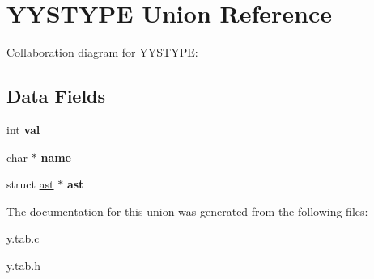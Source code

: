 \hypertarget{union_y_y_s_t_y_p_e}{}\section{Y\+Y\+S\+T\+Y\+PE Union Reference}
\label{union_y_y_s_t_y_p_e}


Collaboration diagram for Y\+Y\+S\+T\+Y\+PE\+:
\subsection*{Data Fields}
\begin{DoxyCompactItemize}
\item 
\mbox{\label{union_y_y_s_t_y_p_e_aa0ccb5ee6d882ee3605ff47745c6467b}} 
int {\bfseries val}
\item 
\mbox{\label{union_y_y_s_t_y_p_e_ad547fb8186b526cb1b588daad4334fbe}} 
char $\ast$ {\bfseries name}
\item 
\mbox{\label{union_y_y_s_t_y_p_e_acfe6dda4268774a7eb23648d7a805f0d}} 
struct \hyperlink{structast}{ast} $\ast$ {\bfseries ast}
\end{DoxyCompactItemize}


The documentation for this union was generated from the following files\+:\begin{DoxyCompactItemize}
\item 
y.\+tab.\+c\item 
y.\+tab.\+h\end{DoxyCompactItemize}
